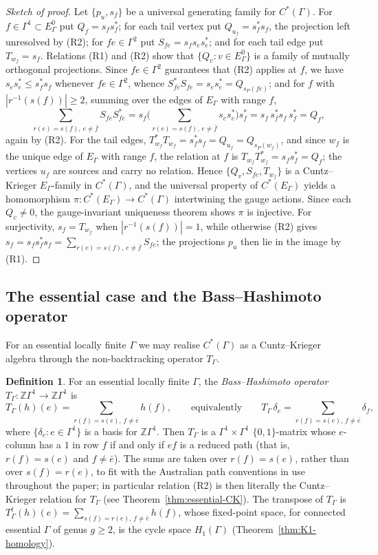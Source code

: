 \documentclass[12pt,reqno]{amsart}
\theoremstyle{plain}
\theoremstyle{definition}
\newtheorem{definition}[theorem]{Definition}
\newcommand{\Z}{\mathbb{Z}}
\begin{document}
\begin{proof}[Sketch of proof]
Let $\{p_u,s_f\}$ be a universal generating family for $C^*(\Gamma)$. For $f\in\Gamma^1\subset
E_\Gamma^0$ put $Q_f=s_fs_f^*$; for each tail vertex put $Q_{u_f}=s_f^*s_f$, the projection left
unresolved by (R2); for $fe\in\Gamma^2$ put $S_{fe}=s_fs_es_e^*$; and for each tail edge put
$T_{w_f}=s_f$. Relations (R1) and (R2) show that $\{Q_v : v\in E_\Gamma^0\}$ is a family of
mutually orthogonal projections. Since $fe\in\Gamma^2$ guarantees that (R2) applies at $f$, we have
$s_es_e^*\le s_f^*s_f$ whenever $fe\in\Gamma^2$, whence
$S_{fe}^*S_{fe}=s_es_e^*=Q_{s_P(fe)}$; and for $f$ with $|r^{-1}(s(f))|\ge 2$, summing over the
edges of $E_\Gamma$ with range $f$,
\[
\sum_{r(e)=s(f),\,e\neq\bar f}S_{fe}S_{fe}^{*}
= s_f\Big(\sum_{r(e)=s(f),\,e\neq\bar f}s_es_e^{*}\Big)s_f^{*}
= s_f\,s_f^{*}s_f\,s_f^{*}=Q_f,
\]
again by (R2). For the tail edges,
$T_{w_f}^*T_{w_f}=s_f^*s_f=Q_{u_f}=Q_{s_P(w_f)}$, and since $w_f$ is the unique edge of $E_\Gamma$
with range $f$, the relation at $f$ is $T_{w_f}T_{w_f}^*=s_fs_f^*=Q_f$; the vertices $u_f$ are
sources and carry no relation. Hence $\{Q_v,S_{fe},T_{w_f}\}$ is a Cuntz--Krieger
$E_\Gamma$-family in $C^*(\Gamma)$, and the universal property of $C^*(E_\Gamma)$ yields a
homomorphism $\pi\colon C^*(E_\Gamma)\to C^*(\Gamma)$ intertwining the gauge actions. Since each
$Q_v\neq 0$, the gauge-invariant uniqueness theorem shows $\pi$ is injective. For surjectivity,
$s_f=T_{w_f}$ when $|r^{-1}(s(f))|=1$, while otherwise (R2) gives
$s_f=s_fs_f^*s_f=\sum_{r(e)=s(f),\,e\neq\bar f}S_{fe}$; the projections $p_u$ then lie in the image
by (R1).
\end{proof}

\subsection*{The essential case and the Bass--Hashimoto operator} For an essential locally finite
$\Gamma$ we may realise $C^*(\Gamma)$ as a Cuntz--Krieger algebra through the
non-backtracking operator $T_\Gamma$.

\begin{definition}\label{def:BH}
For an essential locally finite $\Gamma$, the \emph{Bass--Hashimoto operator}
$T_\Gamma\colon\Z\Gamma^1\to\Z\Gamma^1$ is
\[
T_\Gamma(h)(e)=\!\!\sum_{r(f)=s(e),\,f\neq\bar e}\!\! h(f),\qquad\text{equivalently}\qquad
T_\Gamma\,\delta_e=\!\!\sum_{r(f)=s(e),\,f\neq\bar e}\!\!\delta_f,
\]
\noindent
where $\{ \delta_e : e \in \Gamma^1 \}$ is a basis for $\mathbb{Z} \Gamma^1$. Then $T_\Gamma$ is
a $\Gamma^1\times\Gamma^1$ $\{0,1\}$-matrix whose $e$-column has a $1$ in row $f$ if and only if
$ef$ is a reduced path (that is, $r(f)=s(e)$ and $f\neq\bar e$). The sums are taken over
$r(f)=s(e)$, rather than over $s(f)=r(e)$, to fit with the Australian path conventions in use
throughout the paper; in particular relation (R2) is then literally the Cuntz--Krieger relation for
$T_\Gamma$ (see Theorem~\ref{thm:essential-CK}). The transpose of $T_\Gamma$ is
$T_\Gamma^{t}(h)(e)=\sum_{s(f)=r(e),\,f\neq\bar e}h(f)$, whose fixed-point space, for connected
essential $\Gamma$ of genus $g\ge 2$, is the cycle space $H_1(\Gamma)$
\textup(Theorem~\ref{thm:K1-homology}\textup).
\end{definition}
\end{document}
